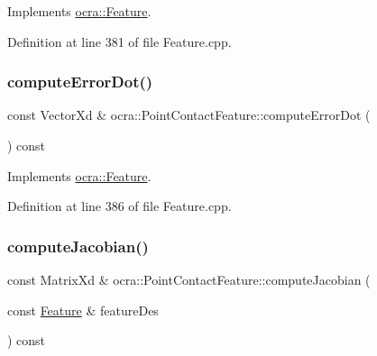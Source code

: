 Implements \hyperlink{classocra_1_1Feature_ac714181e1bb25f878349e299c4ba8c00}{ocra\+::\+Feature}.



Definition at line 381 of file Feature.\+cpp.

\hypertarget{classocra_1_1PointContactFeature_a536bd532919a1a7f37a97aed625112b1}{}\label{classocra_1_1PointContactFeature_a536bd532919a1a7f37a97aed625112b1} 
\subsubsection{\texorpdfstring{compute\+Error\+Dot()}{computeErrorDot()}\hspace{0.1cm}{\footnotesize\ttfamily [2/2]}}
{\footnotesize\ttfamily const Vector\+Xd \& ocra\+::\+Point\+Contact\+Feature\+::compute\+Error\+Dot (\begin{DoxyParamCaption}{ }\end{DoxyParamCaption}) const\hspace{0.3cm}{\ttfamily [virtual]}}



Implements \hyperlink{classocra_1_1Feature_a01a4870418ba87d5b41d8f917c1255fc}{ocra\+::\+Feature}.



Definition at line 386 of file Feature.\+cpp.

\hypertarget{classocra_1_1PointContactFeature_a68a3025a23aa9ff8bec2aeb0c966c352}{}\label{classocra_1_1PointContactFeature_a68a3025a23aa9ff8bec2aeb0c966c352} 
\subsubsection{\texorpdfstring{compute\+Jacobian()}{computeJacobian()}\hspace{0.1cm}{\footnotesize\ttfamily [1/2]}}
{\footnotesize\ttfamily const Matrix\+Xd \& ocra\+::\+Point\+Contact\+Feature\+::compute\+Jacobian (\begin{DoxyParamCaption}\item[{const \hyperlink{classocra_1_1Feature}{Feature} \&}]{feature\+Des }\end{DoxyParamCaption}) const\hspace{0.3cm}{\ttfamily [virtual]}}




